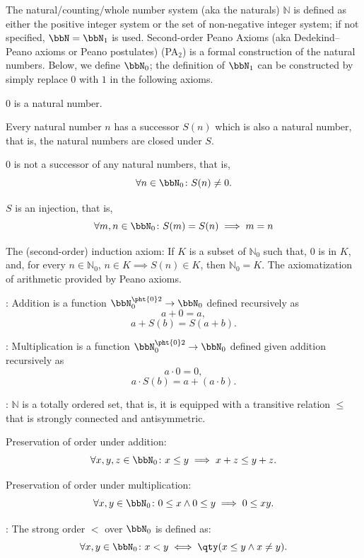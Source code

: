 \documentclass[a4paper,12pt]{article}
\begin{document}
The natural/counting/whole number system (aka the naturals) $\mathbb{N}$ is defined as either the positive integer system or the set of non-negative integer system; if not specified, $\bbN=\bbN_1$ is used.
Second-order Peano Axioms (aka Dedekind–Peano axioms or Peano postulates) (PA$_2$) is a formal construction of the natural numbers. Below, we define $\bbN_0$; the definition of $\bbN_1$ can be constructed by simply replace $0$ with $1$ in the following axioms.
\bit
\item $0$ is a natural number.
\item Every natural number $n$ has a successor $S(n)$ which is also a natural number, that is, the natural numbers are closed under $S$.
\item $0$ is not a successor of any natural numbers, that is,
\[\forall n\in\bbN_0\colon S(n)\neq 0.\]
\item $S$ is an injection, that is,
\[\forall m,n\in\bbN_0\colon S(m)=S(n)\implies m=n\]
\item The (second-order) induction axiom: If $K$ is a subset of $\mathbb{N}_0$ such that, $0$ is in $K$, and, for every $n\in\mathbb{N}_0$, $n\in K\implies S(n)\in K$, then $\mathbb{N}_0=K$.
\eit
{}
The axiomatization of arithmetic provided by Peano axioms.
\bit
\item {}: Addition is a function $\bbN_0^{\pht{0}2}\to\bbN_0$ defined recursively as
\[a+0=a,\]
\[a+S(b)=S(a+b).\]
\item {}: Multiplication is a function $\bbN_0^{\pht{0}2}\to\bbN_0$ defined given addition recursively as
\[a\cdot 0=0,\]
\[a\cdot S(b)=a+(a\cdot b).\]
\item {}: $\mathbb{N}$ is a totally ordered set, that is, it is equipped with a transitive relation $\leq$ that is strongly connected and antisymmetric.
\bit
\item Preservation of order under addition:
\[\forall x,y,z\in\bbN_0\colon x\leq y\implies x+z\leq y+z.\]
\item Preservation of order under multiplication:
\[\forall x,y\in\bbN_0\colon 0\leq x\land 0\leq y\implies 0\leq xy.\]
\eit
\item {}: The strong order $<$ over $\bbN_0$ is defined as:
\[\forall x,y\in\bbN_0\colon x<y\iff\qty(x\leq y\land x\neq y).\]
\eit
{}
\end{document}
